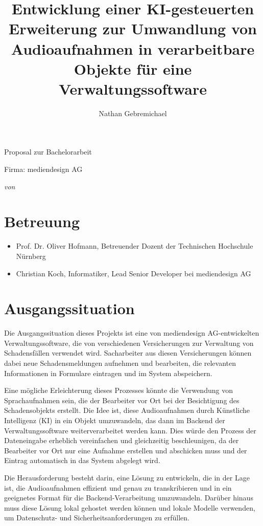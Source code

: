\documentclass[12pt,a4paper,parskip=full]{scrartcl}
\title{Entwicklung einer KI-gesteuerten Erweiterung zur Umwandlung von Audioaufnahmen in verarbeitbare Objekte für eine Verwaltungssoftware}
\author{Nathan Gebremichael}
\date{}
\newcommand{\firma}{mediendesign AG}
\begin{document}
\makeatletter

{
    \centering
    {\Large Proposal zur Bachelorarbeit \par}
    \vspace*{1cm}
    {\LARGE \@title \par}
    \vspace*{1cm}
    {\large Firma: \firma \par}
    \vspace*{0.5cm}
    {\textit{\small von \@author} \par}
    }

\section*{Betreuung}
\begin{itemize}
    \item Prof. Dr. Oliver Hofmann, Betreuender Dozent der Technischen Hochschule Nürnberg
    \item Christian Koch, Informatiker, Lead Senior Developer bei mediendesign AG
\end{itemize}

\section*{Ausgangssituation}
Die Ausgangssituation dieses Projekts ist eine von mediendesign AG-entwickelten Verwaltungssoftware, die von verschiedenen Versicherungen zur Verwaltung von Schadensfällen verwendet wird.
Sacharbeiter aus diesen Versicherungen können dabei neue Schadensmeldungen aufnehmen und bearbeiten, die relevanten Informationen in Formulare eintragen und im System abspeichern.

Eine mögliche Erleichterung dieses Prozesses könnte die Verwendung von Sprachaufnahmen sein, die der Bearbeiter vor Ort bei der Besichtigung des Schadensobjekts erstellt.
Die Idee ist, diese Audioaufnahmen durch Künstliche Intelligenz (KI) in ein Objekt umzuwandeln, das dann im Backend der Verwaltungssoftware weiterverarbeitet werden kann.
Dies würde den Prozess der Dateneingabe erheblich vereinfachen und gleichzeitig beschleunigen, da der Bearbeiter vor Ort nur eine Aufnahme erstellen und abschicken muss und der Eintrag automatisch in das System abgelegt wird.

Die Herausforderung besteht darin, eine Lösung zu entwickeln, die in der Lage ist, die Audioaufnahmen effizient und genau zu transkribieren und in ein geeignetes Format für die Backend-Verarbeitung umzuwandeln.
Darüber hinaus muss diese Lösung lokal gehostet werden können und lokale Modelle verwenden, um Datenschutz- und Sicherheitsanforderungen zu erfüllen.
\end{document}
